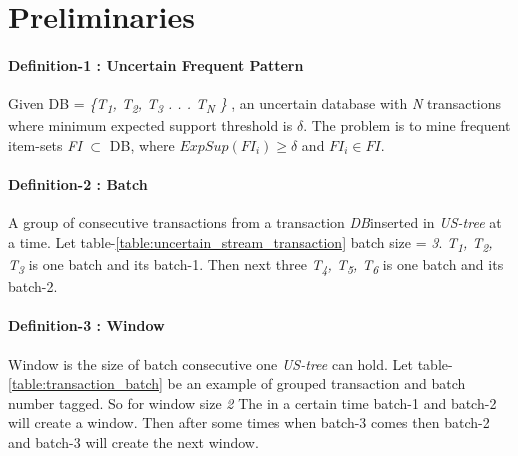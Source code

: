     
\section{Preliminaries}
    \paragraph{Definition-1 : Uncertain Frequent Pattern} 
    Given DB = \emph{\{T\textsubscript{1}, T\textsubscript{2}, T\textsubscript{3} . . . T\textsubscript{N} \}} , an uncertain database with \emph{N} transactions where minimum expected support threshold is $\delta$. The problem is to mine frequent item-sets \emph{FI} $\subset$ DB, where $ExpSup(FI_i) \geq \delta $ and $FI_i \in FI$.
    
    \paragraph{Definition-2 : Batch} 
    A group of consecutive transactions from a transaction \emph{DB}inserted in \emph{US-tree} at a time. Let table-\ref{table:uncertain_stream_transaction} batch size = \emph{3}. \emph{T\textsubscript{1}, T\textsubscript{2}, T\textsubscript{3}} is one batch and its batch-1. Then next three \emph{T\textsubscript{4}, T\textsubscript{5}, T\textsubscript{6}} is one batch and its batch-2.
    
    \paragraph{Definition-3 : Window} Window is the size of batch consecutive one \emph{US-tree} can hold. Let table-\ref{table:transaction_batch} be an example of grouped transaction and batch number tagged. So for window size \emph{2} The in a certain time batch-1 and batch-2 will create a window. Then after some times when batch-3 comes then batch-2 and batch-3 will create the next window.
    
